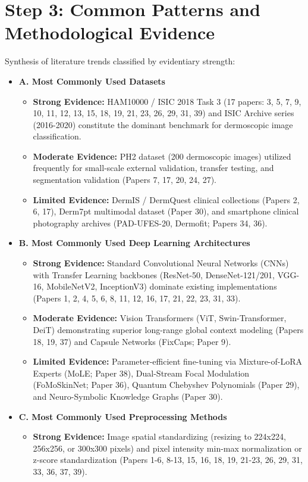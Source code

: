 \documentclass[11pt,a4paper]{article}
\begin{document}
\section{Step 3: Common Patterns and Methodological Evidence}
Synthesis of literature trends classified by evidentiary strength:
\begin{itemize}
\item \textbf{A. Most Commonly Used Datasets}
\begin{itemize}
  \item \textbf{Strong Evidence:} HAM10000 / ISIC 2018 Task 3 (17 papers: 3, 5, 7, 9, 10, 11, 12, 13, 15, 18, 19, 21, 23, 26, 29, 31, 39) and ISIC Archive series (2016-2020) constitute the dominant benchmark for dermoscopic image classification.
  \item \textbf{Moderate Evidence:} PH2 dataset (200 dermoscopic images) utilized frequently for small-scale external validation, transfer testing, and segmentation validation (Papers 7, 17, 20, 24, 27).
  \item \textbf{Limited Evidence:} DermIS / DermQuest clinical collections (Papers 2, 6, 17), Derm7pt multimodal dataset (Paper 30), and smartphone clinical photography archives (PAD-UFES-20, Dermofit; Papers 34, 36).
\end{itemize}
\item \textbf{B. Most Commonly Used Deep Learning Architectures}
\begin{itemize}
  \item \textbf{Strong Evidence:} Standard Convolutional Neural Networks (CNNs) with Transfer Learning backbones (ResNet-50, DenseNet-121/201, VGG-16, MobileNetV2, InceptionV3) dominate existing implementations (Papers 1, 2, 4, 5, 6, 8, 11, 12, 16, 17, 21, 22, 23, 31, 33).
  \item \textbf{Moderate Evidence:} Vision Transformers (ViT, Swin-Transformer, DeiT) demonstrating superior long-range global context modeling (Papers 18, 19, 37) and Capsule Networks (FixCaps; Paper 9).
  \item \textbf{Limited Evidence:} Parameter-efficient fine-tuning via Mixture-of-LoRA Experts (MoLE; Paper 38), Dual-Stream Focal Modulation (FoMoSkinNet; Paper 36), Quantum Chebyshev Polynomials (Paper 29), and Neuro-Symbolic Knowledge Graphs (Paper 30).
\end{itemize}
\item \textbf{C. Most Commonly Used Preprocessing Methods}
\begin{itemize}
  \item \textbf{Strong Evidence:} Image spatial standardizing (resizing to 224x224, 256x256, or 300x300 pixels) and pixel intensity min-max normalization or z-score standardization (Papers 1-6, 8-13, 15, 16, 18, 19, 21-23, 26, 29, 31, 33, 36, 37, 39).

\end{itemize}
\end{itemize}
\end{document}
